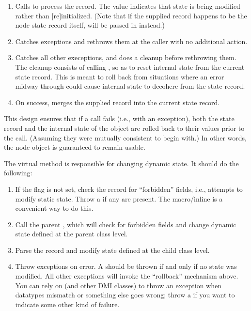 \documentclass[10pt]{article}
\begin{document}
\begin{enumerate}

  \item Calls  to process the record. The
     value indicates that state is being modified rather than
    [re]initialized. (Note that if the supplied record happens to be the node
    state record itself,  will be passed in instead.)

  \item Catches  exceptions and rethrows them at the
    caller with no additional action.
    
  \item Catches all other execeptions, and does a cleanup before rethrowing
    them. The cleanup consists of calling , so
    as to reset internal state from the current state record. This is meant to
    roll back from situations where an error midway through 
    could cause internal state to decohere from the state record.

  \item On success, merges the supplied record into the current state record.

\end{enumerate}

  This design ensures that if a  call fails (i.e., with an
  exception), both the state record and the internal state of the object are
  rolled back to their values prior to the call. (Assuming they were mutually
  consistent to begin with.) In other words, the node object is guaranteed to
  remain usable.

  The virtual  method is responsible for changing dynamic
  state. It should do the following:

\begin{enumerate}

  \item If the  flag is not set, check the record for
    ``forbidden'' fields, i.e., attempts to modify static state. Throw a
     if any are present. The
      macro/inline is a convenient way to
    do this.

  \item Call the parent , which will check for forbidden fields and 
    change dynamic state defined at the parent class level.
    
  \item Parse the record and modify state defined at the child class level.
    
  \item Throw exceptions on error. A  should be
    thrown if and only if no state was modified. All other exceptions will
    invoke the ``rollback'' mechanism above. You can rely on 
    (and other DMI classes) to throw an exception when datatypes mismatch or
    something else goes wrong; throw a  if you want
    to indicate some other kind of failure.

\end{enumerate}
\end{document}
